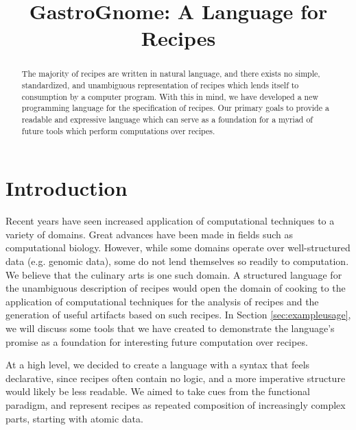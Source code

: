 \documentclass[pldi]{sigplanconf-pldi15}
\begin{document}
\title{GastroGnome: A Language for Recipes}

\maketitle
\begin{abstract}
The majority of recipes are written in natural language, and there exists no
simple, standardized, and unambiguous representation of recipes which lends
itself to consumption by a computer program. With this in mind, we have
developed a new programming language for the specification of recipes. Our
primary goals to provide a readable and expressive language which can serve as
a foundation for a myriad of future tools which perform computations over
recipes.
\end{abstract}

\section{Introduction}
Recent years have seen increased application of computational techniques to a
variety of domains. Great advances have been made in fields such as
computational biology. However, while some domains operate over
well-structured data (e.g. genomic data), some do not lend themselves so
readily to computation. We believe that the culinary arts is one such domain.
A structured language for the unambiguous description of recipes would open
the domain of cooking to the application of computational techniques for the
analysis of recipes and the generation of useful artifacts based on such
recipes. In Section \ref{sec:exampleusage}, we will discuss some tools that we
have created to demonstrate the language’s promise as a foundation for
interesting future computation over recipes.

At a high level, we decided to create a language with a syntax that feels
declarative, since recipes often contain no logic, and a more imperative
structure would likely be less readable. We aimed to take cues from the
functional paradigm, and represent recipes as repeated composition of
increasingly complex parts, starting with atomic data.
\end{document}
